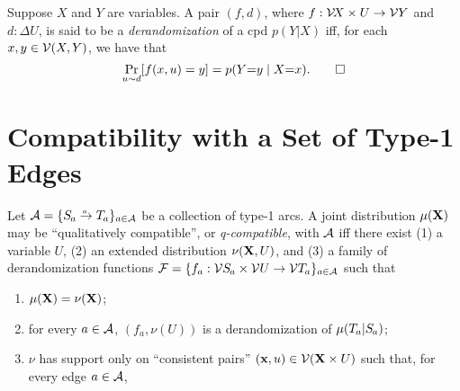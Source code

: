 \documentclass{article}
\begin{document}
\begin{defn}
    Suppose $X$ and $Y$ are variables.
    A pair $(f, d)$, where $f : \mathcal V\!X \times U \to \mathcal V Y$ and $d : \Delta U$,
    is said to be a \emph{derandomization} of a cpd $p(Y|X)$ iff, for each $x, y \in \mathcal V(X,Y)$, we have that 
    \[
        \Pr_{u\sim d} [ f(x, u) = y] = p(Y{=}y\mid X{=}x).
        \qedhere
    \]
\end{defn}

\section{Compatibility with a Set of Type-1 Edges}
\begin{defn}
    Let $\Ar 
    = \{ \ed {a}{\Src a}{\Tgt a} \}_{a \in \Ar}
    $ be a collection of type-1 arcs. 
    A joint distribution $\mu(\mathbf{X})$ may be ``qualitatively compatible'', or
    \emph{q-compatible}, with $\mathcal A$  iff
% 
    there exist (1) a variable $U$, 
    (2) an extended distribution $\nu(\mathbf{X}, U)$,
    and (3) a family of derandomization functions  
    $\mathcal F = \{ f_a : \V\Src a \times \V U \to  \V\Tgt a\}_{a\in \Ar} $ such that
    \begin{enumerate}[label=(\alph*)]
        \item $\mu(\mathbf{X}) = \nu(\mathbf{X})$;
        \item  for every $a \in \mathcal A$, $(f_a, \nu(U))$ is a derandomization 
        of $\mu(\Tgt a | \Src a)$;
        \item $\nu$ has support only on ``consistent pairs''
        $(\mathbf{x}, u) \in \mathcal V(\mathbf{X} \times U)$
        such that, for every edge $a \in \mathcal A$, 

\end{enumerate}
\end{defn}
\end{document}
